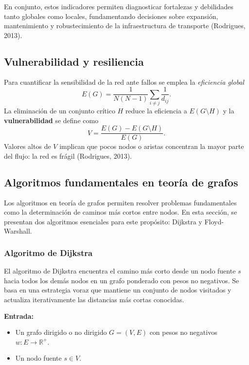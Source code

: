 \documentclass[openany]{book}
\begin{document}
		En conjunto, estos indicadores permiten diagnosticar fortalezas y debilidades tanto globales como locales, fundamentando decisiones sobre expansión, mantenimiento y robustecimiento de la infraestructura de transporte (Rodrigues, 2013).


		\subsection{Vulnerabilidad y resiliencia}

		Para cuantificar la sensibilidad de la red ante fallos se emplea la \emph{eficiencia global}
		\begin{equation}
			E(G)=\frac{1}{N(N-1)}\sum_{i\neq j}\frac{1}{d_{ij}}.
		\end{equation}
		La eliminación de un conjunto crítico $H$ reduce la eficiencia a $E(G\setminus H)$ y la \textbf{vulnerabilidad} se define como
		\begin{equation}
			V=\frac{E(G)-E(G\setminus H)}{E(G)}.
		\end{equation}
		Valores altos de $V$ implican que pocos nodos o aristas concentran la mayor parte del flujo: la red es frágil (Rodrigues, 2013).

		\subsection{Algoritmos fundamentales en teoría de grafos}
			Los algoritmos en teoría de grafos permiten resolver problemas fundamentales como la determinación de caminos más cortos entre nodos. En esta sección, se presentan dos algoritmos esenciales para este propósito: Dijkstra y Floyd-Warshall.

			\subsubsection{Algoritmo de Dijkstra}

			El algoritmo de Dijkstra encuentra el camino más corto desde un nodo fuente $s$ hacia todos los demás nodos en un grafo ponderado con pesos no negativos. Se basa en una estrategia voraz que mantiene un conjunto de nodos visitados y actualiza iterativamente las distancias más cortas conocidas.

			\textbf{Entrada:}
			\begin{itemize}
				\item Un grafo dirigido o no dirigido $G = (V, E)$ con pesos no negativos $w: E \to \mathbb{R}^+$.
				\item Un nodo fuente $s \in V$.
			\end{itemize}
\end{document}
